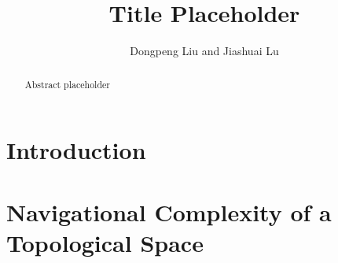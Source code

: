 \documentclass[12pt,twoside]{article}
\begin{document}
\title{Title Placeholder}

\author{
Dongpeng Liu%
and Jiashuai Lu%
}


\maketitle

%
\begin{abstract}
Abstract placeholder
\end{abstract}

\setcounter{page}{0}

\section{Introduction}\label{sec:intro}


\section{Navigational Complexity of a Topological Space}\label{sec:complexity}




\end{document}
